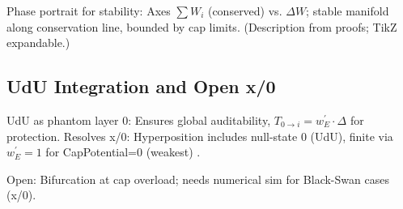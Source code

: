 \documentclass{article}
\begin{document}
Phase portrait for stability: Axes $\sum W_i$ (conserved) vs. $\Delta W$; stable manifold along conservation line, bounded by cap limits. (Description from proofs; TikZ expandable.)

\subsection{UdU Integration and Open x/0}

UdU as phantom layer 0: Ensures global auditability, $T_{0\to i} = w_E^\prime \cdot \Delta$ for protection. Resolves x/0: Hyperposition includes null-state 0 (UdU), finite via $w_E^\prime=1$ for CapPotential=0 (weakest) \cite{seed_2025}.

Open: Bifurcation at cap overload; needs numerical sim for Black-Swan cases (x/0).



\end{document}
